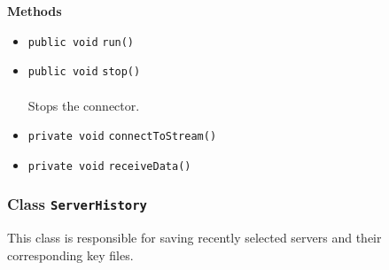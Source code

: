 \textbf{\sffamily Methods}
\begin{itemize}
\item \lstinline|public void| \lstinline|run|\lstinline|()| \\[-0.6em]




\item \lstinline|public void| \lstinline|stop|\lstinline|()|\\ \\[-0.6em]
Stops the connector.



\item \lstinline|private void| \lstinline|connectToStream|\lstinline|()| \\[-0.6em]




\item \lstinline|private void| \lstinline|receiveData|\lstinline|()| \\[-0.6em]




\end{itemize}

\subsubsection{Class \lstinline|ServerHistory|}
This class is responsible for saving recently selected servers
 and their corresponding key files. \\
\noindent\begin{minipage}[t]{5cm}
\vspace{0.3em}
\hspace*{2em}
\vspace{0.3em}
\end{minipage}



